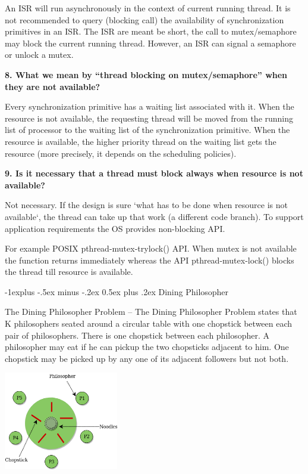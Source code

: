 \documentclass[8pt,landscape]{article}
\makeatletter
\renewcommand{\subsection}{\@startsection{subsection}{2}{0mm}%
                                {-1explus -.5ex minus -.2ex}%
                                {0.5ex plus .2ex}%
                                {\normalfont\scriptsize\bfseries}}
\makeatother
\begin{document}
\begin{multicols}{3}
\begin{tiny}
An ISR will run asynchronously in the context of current running thread. It is not recommended to query (blocking call) the availability of synchronization primitives in an ISR. The ISR are meant be short, the call to mutex/semaphore may block the current running thread. However, an ISR can signal a semaphore or unlock a mutex.

\textbf{8. What we mean by “thread blocking on mutex/semaphore” when they are not available?}

Every synchronization primitive has a waiting list associated with it. When the resource is not available, the requesting thread will be moved from the running list of processor to the waiting list of the synchronization primitive. When the resource is available, the higher priority thread on the waiting list gets the resource (more precisely, it depends on the scheduling policies).

\textbf{9. Is it necessary that a thread must block always when resource is not available?}

Not necessary. If the design is sure ‘what has to be done when resource is not available‘, the thread can take up that work (a different code branch). To support application requirements the OS provides non-blocking API.

For example POSIX pthread-mutex-trylock() API. When mutex is not available the function returns immediately whereas the API pthread-mutex-lock() blocks the thread till resource is available.

\subsection{Dining Philosopher}

The Dining Philosopher Problem – The Dining Philosopher Problem states that K philosophers seated around a circular table with one chopstick between each pair of philosophers. There is one chopstick between each philosopher. A philosopher may eat if he can pickup the two chopsticks adjacent to him. One chopstick may be picked up by any one of its adjacent followers but not both.

\begingroup
	\centering
	\includegraphics[width=5cm]{philo.png}
	\label{fig:a}
\endgroup


\end{tiny}
\end{multicols}
\end{document}
